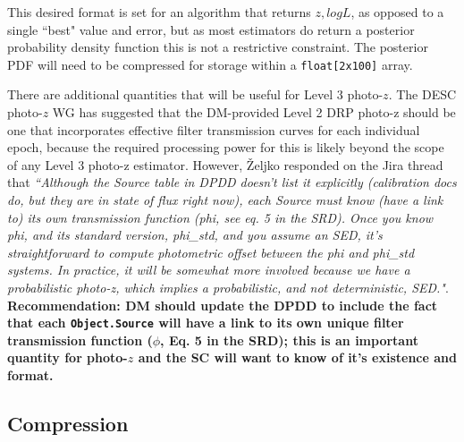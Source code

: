 \documentclass[DM,lsstdraft,toc]{lsstdoc}
\begin{document}
\noindent This desired format is set for an algorithm that returns $z,logL$, as opposed to a single ``best" value and error, but as most estimators do return a posterior probability density function this is not a restrictive constraint. The posterior PDF will need to be compressed for storage within a {\tt float[2x100]} array.

There are additional quantities that will be useful for Level 3 photo-$z$. The DESC photo-$z$ WG has suggested that the DM-provided Level 2 DRP photo-z should be one that incorporates effective filter transmission curves for each individual epoch, because the required processing power for this is likely beyond the scope of any Level 3 photo-z estimator. However, \v{Z}eljko responded on the Jira thread that {\it ``Although the Source table in DPDD doesn't list it explicitly (calibration docs do, but they are in state of flux right now), each Source must know (have a link to) its own transmission function (phi, see eq. 5 in the SRD). Once you know phi, and its standard version, phi\_std, and you assume an SED, it's straightforward to compute photometric offset between the phi and phi\_std systems. In practice, it will be somewhat more involved because we have a probabilistic photo-z, which implies a probabilistic, and not deterministic, SED."}. \\
\textbf{Recommendation:  DM should update the DPDD to include the fact that each {\tt Object.Source} will have a link to its own unique filter transmission function ($\phi$, Eq. 5 in the SRD); this is an important quantity for photo-$z$ and the SC will want to know of it's existence and format.}


\subsection{Compression}\label{ssec:format_compression}
\end{document}

